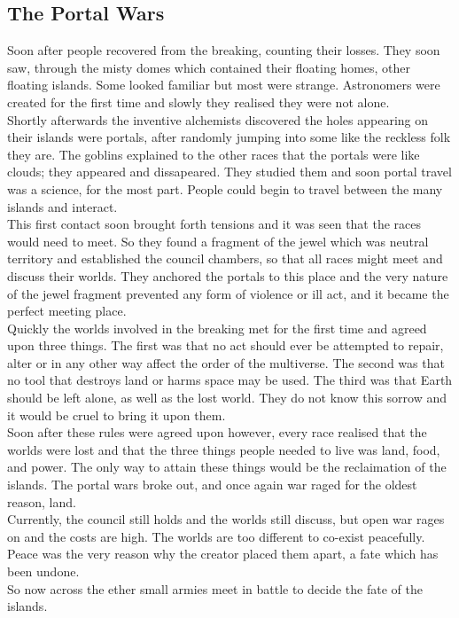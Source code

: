 \documentclass[a4paper]{article}
\begin{document}
\subsection{The Portal Wars}

Soon after people recovered from the breaking, counting their losses. They soon saw, through the misty domes which contained their floating homes, other floating islands. Some looked familiar but most were strange. Astronomers were created for the first time and slowly they realised they were not alone.\\
Shortly afterwards the inventive alchemists discovered the holes appearing on their islands were portals, after randomly jumping into some like the reckless folk they are. The goblins explained to the other races that the portals were like clouds; they appeared and dissapeared. They studied them and soon portal travel was a science, for the most part. People could begin to travel between the many islands and interact.\\
This first contact soon brought forth tensions and it was seen that the races would need to meet. So they found a fragment of the jewel which was neutral territory and established the council chambers, so that all races might meet and discuss their worlds. They anchored the portals to this place and the very nature of the jewel fragment prevented any form of violence or ill act, and it became the perfect meeting place.\\
Quickly the worlds involved in the breaking met for the first time and agreed upon three things. The first was that no act should ever be attempted to repair, alter or in any other way affect the order of the multiverse. The second was that no tool that destroys land or harms space may be used. The third was that Earth should be left alone, as well as the lost world. They do not know this sorrow and it would be cruel to bring it upon them.\\
Soon after these rules were agreed upon however, every race realised that the worlds were lost and that the three things people needed to live was land, food, and power. The only way to attain these things would be the reclaimation of the islands. The portal wars broke out, and once again war raged for the oldest reason, land.\\
Currently, the council still holds and the worlds still discuss, but open war rages on and the costs are high. The worlds are too different to co-exist peacefully. Peace was the very reason why the creator placed them apart, a fate which has been undone.\\
So now across the ether small armies meet in battle to decide the fate of the islands.
\end{document}

